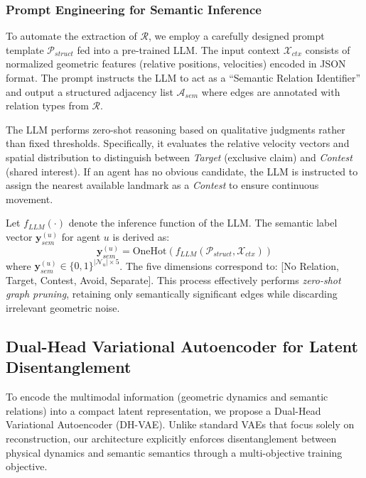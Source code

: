 \documentclass[conference]{IEEEtran}
\begin{document}
\subsubsection{Prompt Engineering for Semantic Inference}
To automate the extraction of $\mathcal{R}$, we employ a carefully designed prompt template $\mathcal{P}_{struct}$ fed into a pre-trained LLM. The input context $\mathcal{X}_{ctx}$ consists of normalized geometric features (relative positions, velocities) encoded in JSON format. The prompt instructs the LLM to act as a ``Semantic Relation Identifier'' and output a structured adjacency list $\mathcal{A}_{sem}$ where edges are annotated with relation types from $\mathcal{R}$. 

The LLM performs zero-shot reasoning based on qualitative judgments rather than fixed thresholds. Specifically, it evaluates the relative velocity vectors and spatial distribution to distinguish between \textit{Target} (exclusive claim) and \textit{Contest} (shared interest). If an agent has no obvious candidate, the LLM is instructed to assign the nearest available landmark as a \textit{Contest} to ensure continuous movement.

Let $f_{LLM}(\cdot)$ denote the inference function of the LLM. The semantic label vector $\mathbf{y}_{sem}^{(u)}$ for agent $u$ is derived as:
\begin{equation}
    \mathbf{y}_{sem}^{(u)} = \text{OneHot}\left( f_{LLM}(\mathcal{P}_{struct}, \mathcal{X}_{ctx}) \right)
\end{equation}
where $\mathbf{y}_{sem}^{(u)} \in \{0, 1\}^{| \mathcal{N}_u | \times 5}$. The five dimensions correspond to: [No Relation, Target, Contest, Avoid, Separate]. This process effectively performs \textit{zero-shot graph pruning}, retaining only semantically significant edges while discarding irrelevant geometric noise.

\subsection{Dual-Head Variational Autoencoder for Latent Disentanglement}

To encode the multimodal information (geometric dynamics and semantic relations) into a compact latent representation, we propose a Dual-Head Variational Autoencoder (DH-VAE). Unlike standard VAEs that focus solely on reconstruction, our architecture explicitly enforces disentanglement between physical dynamics and semantic semantics through a multi-objective training objective.
\end{document}
